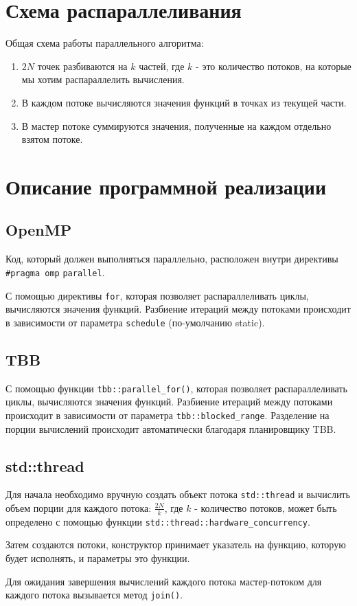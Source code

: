 \documentclass{report}
\begin{document}
\newpage

\section*{Схема распараллеливания}
Общая схема работы параллельного алгоритма:
\begin{enumerate}
\item $2N$ точек разбиваются на $k$ частей, где $k$ - это количество потоков, на которые мы хотим распараллелить вычисления.
\item В каждом потоке вычисляются значения функций в точках из текущей части.
\item В мастер потоке суммируются значения, полученные на каждом отдельно взятом потоке.
\end{enumerate}
\newpage

\section*{Описание программной реализации}
\subsection*{OpenMP}
Код, который должен выполняться параллельно, расположен внутри директивы  \verb|#pragma omp| \verb|parallel|.
\par С помощью директивы \verb|for|, которая позволяет распараллеливать циклы, вычисляются значения функций. Разбиение итераций между потоками происходит в зависимости от параметра \verb|schedule| (по-умолчанию static).

\subsection*{TBB}
С помощью функции \verb|tbb::parallel_for()|, которая позволяет распараллеливать циклы, вычисляются значения функций. Разбиение итераций между потоками происходит в зависимости от параметра \verb|tbb::blocked_range|. Разделение на порции вычислений происходит автоматически благодаря планировщику TBB.

\subsection*{std::thread}
Для начала необходимо вручную создать объект потока \verb|std::thread| и вычислить объем порции для каждого потока: $\frac{2N}{k}$, где $k$ - количество потоков, может быть определено с помощью функции \verb|std::thread::hardware_concurrency|.
\par Затем создаются потоки, конструктор  принимает указатель на функцию, которую будет исполнять, и параметры это функции.
\par Для ожидания завершения вычислений каждого потока мастер-потоком для каждого потока вызывается метод \verb|join()|. 
\newpage
\end{document}
